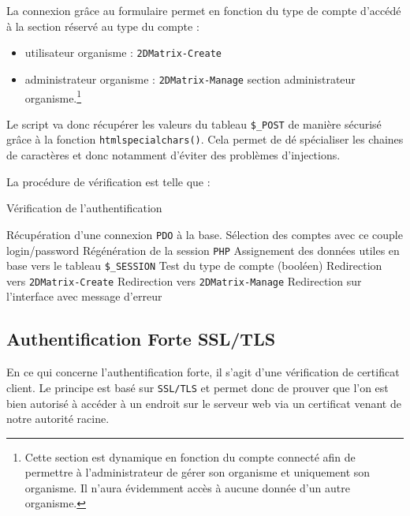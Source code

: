 La connexion grâce au formulaire permet en fonction du type de compte d'accédé à la section réservé au type du compte :

\begin{itemize}
    \item utilisateur organisme : \texttt{2DMatrix-Create}
    \item administrateur organisme : \texttt{2DMatrix-Manage} section administrateur organisme.\footnote{Cette section est dynamique en fonction du compte connecté afin de permettre à l'administrateur de gérer son organisme et uniquement son organisme. Il n'aura évidemment accès à aucune donnée d'un autre organisme. }
\end{itemize}

Le script va donc récupérer les valeurs du tableau \texttt{\$\_POST} de manière sécurisé grâce à la fonction \texttt{htmlspecialchars()}. Cela permet de dé spécialiser les chaines de caractères et donc notamment d'éviter des problèmes d'injections. 

La procédure de vérification est telle que :
\begin{algorithm}
\caption{Vérification de l'authentification}
\begin{algorithmic} 
\STATE Récupération d'une connexion \texttt{PDO} à la base.
\STATE Sélection des comptes avec ce couple login/password
\STATE Régénération de la session \texttt{PHP}
\STATE Assignement des données utiles en base vers le tableau \texttt{\$\_SESSION}
\STATE Test du type de compte (booléen)
\STATE Redirection vers \texttt{2DMatrix-Create} 
\ELSE
\STATE Redirection vers \texttt{2DMatrix-Manage}  
\ENDIF
\ELSE
\STATE Redirection sur l'interface avec message d'erreur
\ENDIF
\end{algorithmic}
\end{algorithm}

\subsection{Authentification Forte SSL/TLS}

En ce qui concerne l'authentification forte, il s'agit d'une vérification de certificat client. Le principe est basé sur \texttt{SSL/TLS} et permet donc de prouver que l'on est bien autorisé à accéder à un endroit sur le serveur web via un certificat venant de notre autorité racine.

